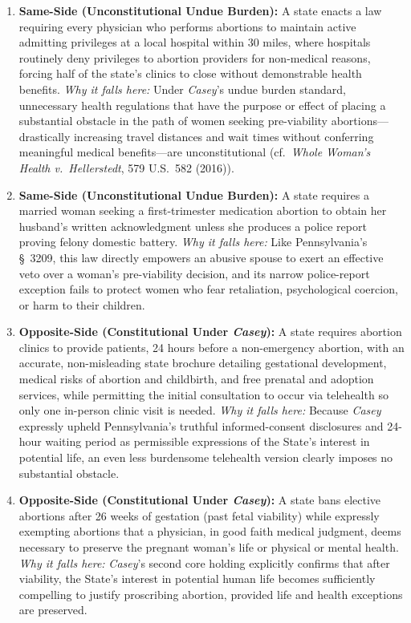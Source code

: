 \documentclass[12pt]{article}
\begin{document}
\begin{enumerate}
\item \textbf{Same-Side (Unconstitutional Undue Burden):} A state enacts a law requiring every physician who performs abortions to maintain active admitting privileges at a local hospital within 30 miles, where hospitals routinely deny privileges to abortion providers for non-medical reasons, forcing half of the state's clinics to close without demonstrable health benefits. \textit{Why it falls here:} Under \textit{Casey}'s undue burden standard, unnecessary health regulations that have the purpose or effect of placing a substantial obstacle in the path of women seeking pre-viability abortions---drastically increasing travel distances and wait times without conferring meaningful medical benefits---are unconstitutional (cf.\ \textit{Whole Woman's Health v.\ Hellerstedt}, 579 U.S.\ 582 (2016)).
\item \textbf{Same-Side (Unconstitutional Undue Burden):} A state requires a married woman seeking a first-trimester medication abortion to obtain her husband's written acknowledgment unless she produces a police report proving felony domestic battery. \textit{Why it falls here:} Like Pennsylvania's \S\ 3209, this law directly empowers an abusive spouse to exert an effective veto over a woman's pre-viability decision, and its narrow police-report exception fails to protect women who fear retaliation, psychological coercion, or harm to their children.
\item \textbf{Opposite-Side (Constitutional Under \textit{Casey}):} A state requires abortion clinics to provide patients, 24 hours before a non-emergency abortion, with an accurate, non-misleading state brochure detailing gestational development, medical risks of abortion and childbirth, and free prenatal and adoption services, while permitting the initial consultation to occur via telehealth so only one in-person clinic visit is needed. \textit{Why it falls here:} Because \textit{Casey} expressly upheld Pennsylvania's truthful informed-consent disclosures and 24-hour waiting period as permissible expressions of the State's interest in potential life, an even less burdensome telehealth version clearly imposes no substantial obstacle.
\item \textbf{Opposite-Side (Constitutional Under \textit{Casey}):} A state bans elective abortions after 26 weeks of gestation (past fetal viability) while expressly exempting abortions that a physician, in good faith medical judgment, deems necessary to preserve the pregnant woman's life or physical or mental health. \textit{Why it falls here:} \textit{Casey}'s second core holding explicitly confirms that after viability, the State's interest in potential human life becomes sufficiently compelling to justify proscribing abortion, provided life and health exceptions are preserved.

\end{enumerate}
\end{document}
